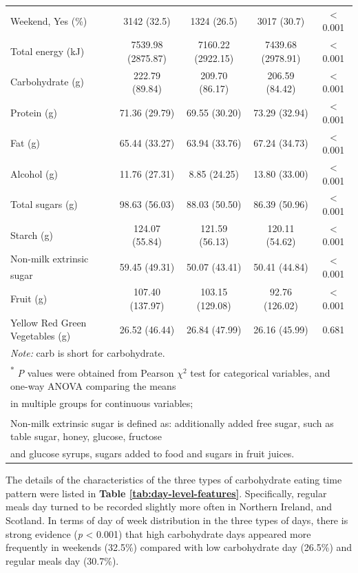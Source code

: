 \begin{table}
\begin{tabular}[t]{lcccc}
		\hspace{1em}Weekend, Yes (\%) & 3142 (32.5) & 1324 (26.5) & 3017 (30.7) & < 0.001\\
		Total energy (kJ) & 7539.98 (2875.87) & 7160.22 (2922.15) & 7439.68 (2978.91) & < 0.001\\
		Carbohydrate (g) & 222.79 (89.84) & 209.70 (86.17) & 206.59 (84.42) & < 0.001\\
		Protein (g) & 71.36 (29.79) & 69.55 (30.20) & 73.29 (32.94) & < 0.001\\
		Fat (g) & 65.44 (33.27) & 63.94 (33.76) & 67.24 (34.73) & < 0.001\\
		Alcohol (g) & 11.76 (27.31) & 8.85 (24.25) & 13.80 (33.00) & < 0.001\\
		Total sugars (g) & 98.63 (56.03) & 88.03 (50.50) & 86.39 (50.96) & < 0.001\\
		Starch (g) & 124.07 (55.84) & 121.59 (56.13) & 120.11 (54.62) & < 0.001\\
		Non-milk extrinsic sugar\textsuperscript{\dag} & 59.45 (49.31) & 50.07 (43.41) & 50.41 (44.84) & < 0.001\\
		Fruit (g) & 107.40 (137.97) & 103.15 (129.08) & 92.76 (126.02) & < 0.001\\
		Yellow Red Green Vegetables (g) & 26.52 (46.44) & 26.84 (47.99) & 26.16 (45.99) & 0.681\\
		\bottomrule
		\multicolumn{5}{l}{{\scriptsize \textit{Note:} carb is short for carbohydrate.}}\\
		\multicolumn{5}{l}{{\scriptsize \textsuperscript{*} \textit{P} values were obtained from Pearson $\chi^2$ test for categorical variables, and one-way ANOVA comparing the means}}\\
		\multicolumn{5}{l}{{\scriptsize  in multiple groups for continuous variables;}}\\
		\multicolumn{5}{l}{{\scriptsize \textsuperscript{\dag} Non-milk extrinsic sugar is defined as: additionally added free sugar, such as table sugar, honey, glucose, fructose}}\\ 
		\multicolumn{5}{l}{{\scriptsize and glucose syrups, sugars added to food and sugars in fruit juices.}}\\
	\end{tabular}
\end{table}

\vspace{-0.5cm}

The details of the characteristics of the three types of carbohydrate eating time pattern were listed in\textbf{ Table \ref{tab:day-level-features}}. Specifically, regular meals day turned to be recorded slightly more often in Northern Ireland, and Scotland. In terms of day of week distribution in the three types of days, there is strong evidence (\textit{p} < 0.001) that high carbohydrate days appeared more frequently in weekends (32.5\%) compared with low carbohydrate day (26.5\%) and regular meals day (30.7\%).


